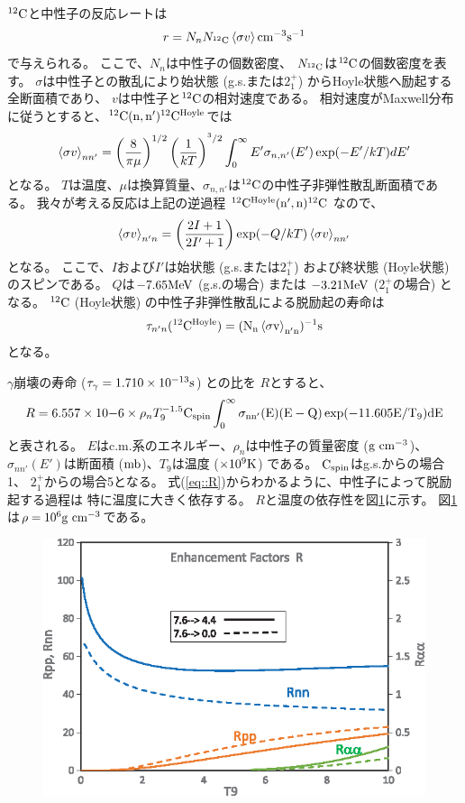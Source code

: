 ${}^{12}\rm{C}$と中性子の反応レートは
\begin{equation}
  r = N_{n}N_{{}^{12}\rm{C}}\braket{\sigma v} \rm{cm}^{-3}\rm{s}^{-1}
  \label{eq::r}
\end{equation}
で与えられる。
ここで、$N_{n}$は中性子の個数密度、
$N_{{}^{12}\rm{C}}$は${}^{12}\rm{C}$の個数密度を表す。
$\sigma$は中性子との散乱により始状態 (g.s.または$2_{1}^{+}$) からHoyle状態へ励起する全断面積であり、
$v$は中性子と${}^{12}\rm{C}$の相対速度である。
相対速度がMaxwell分布に従うとすると、${}^{12}\rm{C}(n,n'){}^{12}\rm{C}^{\rm{Hoyle}}$では
\begin{equation}
  \braket{\sigma v}_{nn'} =
  \left(\frac{8}{\pi\mu}\right)^{1/2}\left(\frac{1}{kT}\right)^{^3/2}
  \int^{\infty}_{0}E'\sigma_{n,n'}(E')\exp(-E'/kT)dE'
  \label{eq::sigmann'}
\end{equation}
となる。
$T$は温度、$\mu$は換算質量、$\sigma_{n,n'}$は${}^{12}\rm{C}$の中性子非弾性散乱断面積である。
我々が考える反応は上記の逆過程 ${}^{12}\rm{C}^{\rm{Hoyle}}(n',n){}^{12}\rm{C}$ なので、
\begin{equation}
  \braket{\sigma v}_{n'n} = \left(\frac{2I+1}{2I'+1}\right)
  \exp(-Q/kT)\braket{\sigma v}_{nn'}
  \label{eq::sigman'n}
\end{equation}
となる。
ここで、$I$および$I'$は始状態 (g.s.または$2_{1}^{+}$)
および終状態 (Hoyle状態) のスピンである。
$Q$は$-7.65\rm{MeV}$ (g.s.の場合) または
$-3.21\rm{MeV}$ ($2_{1}^{+}$の場合) となる。
${}^{12}\rm{C}$ (Hoyle状態) の中性子非弾性散乱による脱励起の寿命は
\begin{equation}
  \tau_{n'n}({}^{12}\rm{C}^{\rm{Hoyle}}) =
  (N_{n}\braket{\sigma v}_{n'n})^{-1} \rm{s}
  \label{eq::tau}
\end{equation}
となる。

$\gamma$崩壊の寿命 ($\tau_{\gamma} = 1.710\times10^{-13} \rm{s}$) との比を
$R$とすると、
\begin{equation}
  R = 6.557\times10{-6}\times\rho_{n}T_{9}^{-1.5}\rm{C}_{\rm{spin}}
  \int^{\infty}_{0}\sigma_{nn'}(E)(E-Q)\exp(-11.605E/T_{9})dE
  \label{eq::R}
\end{equation}
と表される。
$E$はc.m.系のエネルギー、$\rho_{n}$は中性子の質量密度 ($\rm{g}~\rm{cm}^{-3}$)、
$\sigma_{nn'}(E')$は断面積 ($\rm{mb}$)、$T_{9}$は温度 ($\times10^{9} \rm{K}$) である。
$\rm{C}_{\rm{spin}}$はg.s.からの場合1、
$2_{1}^{+}$からの場合5となる。
式(\ref{eq::R})からわかるように、中性子によって脱励起する過程は
特に温度に大きく依存する。
$R$と温度の依存性を図\ref{fig::R}に示す。
図\ref{fig::R}は$\rho = 10^{6}\rm{g}~\rm{cm}^{-3}$である。
\begin{figure}
  \centering
  \includegraphics[clip, width=0.6\columnwidth]{eps/R_T.eps}
  \caption{}
  \label{fig::R}
\end{figure}

